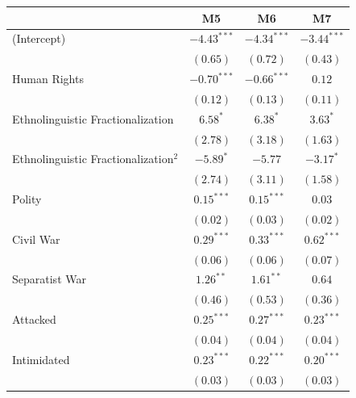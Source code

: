 \documentclass[12pt,]{book}
\let\origtable\table
\let\endorigtable\endtable
\renewenvironment{table}[1][2] {
    \singlespacing
    \expandafter\origtable\expandafter[H]
} {
    \endorigtable
}
\theoremstyle{definition}
\theoremstyle{definition}
\theoremstyle{definition}
\theoremstyle{remark}
\begin{document}
\begin{table}
\begin{center}
\begin{tabular}{l c c c }
\hline
 & M5 & M6 & M7 \\
\hline
(Intercept)                             & $-4.43^{***}$ & $-4.34^{***}$ & $-3.44^{***}$ \\
                                        & $(0.65)$      & $(0.72)$      & $(0.43)$      \\
Human Rights                            & $-0.70^{***}$ & $-0.66^{***}$ & $0.12$        \\
                                        & $(0.12)$      & $(0.13)$      & $(0.11)$      \\
Ethnolinguistic Fractionalization       & $6.58^{*}$    & $6.38^{*}$    & $3.63^{*}$    \\
                                        & $(2.78)$      & $(3.18)$      & $(1.63)$      \\
Ethnolinguistic Fractionalization$^{2}$ & $-5.89^{*}$   & $-5.77$       & $-3.17^{*}$   \\
                                        & $(2.74)$      & $(3.11)$      & $(1.58)$      \\
Polity                                  & $0.15^{***}$  & $0.15^{***}$  & $0.03$        \\
                                        & $(0.02)$      & $(0.03)$      & $(0.02)$      \\
Civil War                               & $0.29^{***}$  & $0.33^{***}$  & $0.62^{***}$  \\
                                        & $(0.06)$      & $(0.06)$      & $(0.07)$      \\
Separatist War                          & $1.26^{**}$   & $1.61^{**}$   & $0.64$        \\
                                        & $(0.46)$      & $(0.53)$      & $(0.36)$      \\
Attacked                                & $0.25^{***}$  & $0.27^{***}$  & $0.23^{***}$  \\
                                        & $(0.04)$      & $(0.04)$      & $(0.04)$      \\
Intimidated                             & $0.23^{***}$  & $0.22^{***}$  & $0.20^{***}$  \\
                                        & $(0.03)$      & $(0.03)$      & $(0.03)$      \\

\end{tabular}
\end{center}
\end{table}
\end{document}
